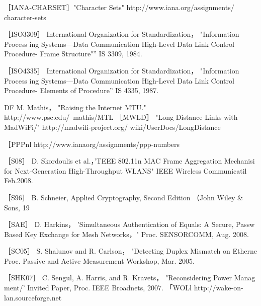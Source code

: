 ［IANA-CHARSET］"Character Sets" http://www.iana.org/assignments/
character-sets

［ISO3309］ International Organization for Standardization， "Information Process
ing Systems—Data Communication High-Level Data Link Control Procedure-
Frame Structure"” IS 3309, 1984.

［ISO4335］ International Organization for Standardization， "Information Process
ing Systems—Data Communication High-Level Data Link Control Procedure-
Elements of Procedure” IS 4335, 1987.

DF M. Mathis， "Raising the Internet MTU." http://www.psc.edu/~mathis/MTL
［MWLD］ "Long Distance Links with MadWiFi/" http://madwifi-project.org/
wiki/UserDocs/LongDistance

［PPPnl http://www.ianaorg/assignments/ppp-numbers

［S08］ D. Skordoulis et al.，'TEEE 802.11n MAC Frame Aggregation Mechanisi
for Next-Generation High-Throughput WLANS" IEEE Wireless Communicatil
Feb.2008.

［S96］ B. Schneier, Applied Cryptography, Second Edition （John Wiley \& Sons, 19

［SAE］ D. Harkins， 'Simultaneous Authentication of Equals: A Secure, Passw
Based Key Exchange for Mesh Networks，" Proc. SENSORCOMM, Aug. 2008.

［SC05］ S. Shalunov and R. Carlson， "Detecting Duplex Mismatch on Etherne
Proc. Passive and Active Measurement Workshop, Mar. 2005.

［SHK07］ C. Sengul, A. Harris, and R. Kravets， "Reconsidering Power Manag
ment/' Invited Paper, Proc. IEEE Broadnets, 2007.
「WOLl http://wake-on-lan.sourceforge.net
